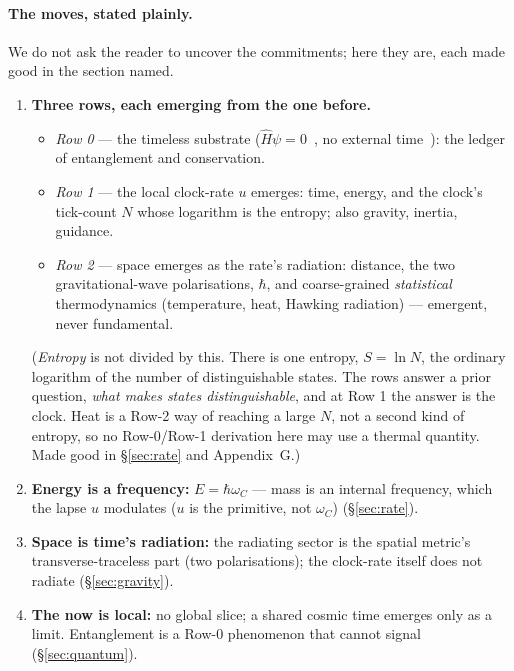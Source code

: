 \documentclass[11pt]{article}
\begin{document}
\paragraph{The moves, stated plainly.} We do not ask the reader to uncover the commitments; here they are, each
made good in the section named.
\begin{enumerate}[leftmargin=1.6em,itemsep=2pt,topsep=2pt,label=\textbf{\arabic*.}]
\item \textbf{Three rows, each emerging from the one before.}
  \begin{itemize}[leftmargin=1.2em,itemsep=0pt,topsep=1pt]
  \item \emph{Row 0} --- the timeless substrate ($\hat H\psi=0$~\cite{DeWitt1967}, no external
    time~\cite{Isham1993}): the ledger of entanglement and conservation.
  \item \emph{Row 1} --- the local clock-rate $u$ emerges: time, energy, and the clock's tick-count $N$
    whose logarithm is the entropy; also gravity, inertia, guidance.
  \item \emph{Row 2} --- space emerges as the rate's radiation: distance, the two gravitational-wave
    polarisations, $\hbar$, and coarse-grained \emph{statistical} thermodynamics (temperature, heat, Hawking
    radiation) --- emergent, never fundamental.
  \end{itemize}
  \noindent (\emph{Entropy} is not divided by this. There is one entropy, $S=\ln N$, the ordinary logarithm
  of the number of distinguishable states. The rows answer a prior question, \emph{what makes states distinguishable}, and at Row 1 the answer is the clock. Heat is a Row-2 way of
  reaching a large $N$, not a second kind of entropy, so no Row-0/Row-1 derivation here may use a thermal
  quantity. Made good in \S\ref{sec:rate} and Appendix~G.)
\item \textbf{Energy is a frequency:} $E=\hbar\omega_C$ --- mass is an internal frequency, which the lapse $u$
  modulates ($u$ is the primitive, not $\omega_C$) (\S\ref{sec:rate}).
\item \textbf{Space is time's radiation:} the radiating sector is the spatial metric's transverse-traceless
  part (two polarisations); the clock-rate itself does not radiate (\S\ref{sec:gravity}).
\item \textbf{The now is local:} no global slice; a shared cosmic time emerges only as a limit. Entanglement is a Row-0 phenomenon that cannot signal (\S\ref{sec:quantum}).
\end{enumerate}
\end{document}
